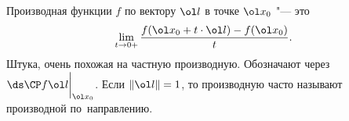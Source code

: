 
	 Производная функции $f$ по вектору $\ol l$ в точке $\ol x_0$ "--- это \[\lim\limits_{t\to 0+}\frac{f(\ol x_0 + t\cdot \ol l) - f(\ol x_0)}{t}.\]
	 Штука, очень похожая на частную производную. Обозначают через $\ds\CP f{\ol l}\bigg|_{\ol x_0}$. Если $\|\ol l\| = 1$, то производную часто называют производной
	 по~направлению.
	 